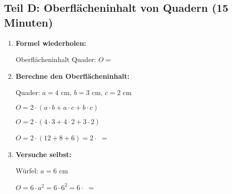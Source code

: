 \subsection*{Teil D: Oberflächeninhalt von Quadern (15 Minuten)}

\begin{enumerate}[label=\arabic*.]
    \item \textbf{Formel wiederholen:}
    \vspace{0.5cm}

    Oberflächeninhalt Quader: $O = $ \underline{\hspace{5cm}}

    \vspace{1cm}

    \item \textbf{Berechne den Oberflächeninhalt:}
    \vspace{0.5cm}

    Quader: $a = 4$ cm, $b = 3$ cm, $c = 2$ cm

    $O = 2 \cdot (a \cdot b + a \cdot c + b \cdot c)$

    $O = 2 \cdot (4 \cdot 3 + 4 \cdot 2 + 3 \cdot 2)$

    $O = 2 \cdot (12 + 8 + 6) = 2 \cdot $ \underline{\hspace{2cm}} $ = $ \underline{\hspace{3cm}}

    \vspace{1cm}

    \item \textbf{Versuche selbst:}

    Würfel: $a = 6$ cm

    $O = 6 \cdot a^2 = 6 \cdot 6^2 = 6 \cdot $ \underline{\hspace{2cm}} $ = $ \underline{\hspace{3cm}}

\end{enumerate}